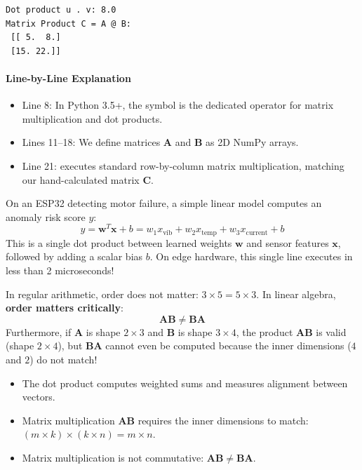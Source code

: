 \begin{lstlisting}[style=outputstyle]
Dot product u . v: 8.0
Matrix Product C = A @ B:
 [[ 5.  8.]
 [15. 22.]]
\end{lstlisting}

\paragraph{Line-by-Line Explanation}
\begin{itemize}
    \item Line 8: In Python 3.5+, the  symbol is the dedicated operator for matrix multiplication and dot products.
    \item Lines 11--18: We define matrices $\mathbf{A}$ and $\mathbf{B}$ as 2D NumPy arrays.
    \item Line 21:  executes standard row-by-column matrix multiplication, matching our hand-calculated matrix $\mathbf{C}$.
\end{itemize}

\begin{iotbox}
On an ESP32 detecting motor failure, a simple linear model computes an anomaly risk score $y$:
\begin{equation*}
y = \mathbf{w}^T \mathbf{x} + b = w_1 x_{\text{vib}} + w_2 x_{\text{temp}} + w_3 x_{\text{current}} + b
\end{equation*}
This is a single dot product between learned weights $\mathbf{w}$ and sensor features $\mathbf{x}$, followed by adding a scalar bias $b$. On edge hardware, this single line executes in less than 2 microseconds!
\end{iotbox}

\begin{warning}
In regular arithmetic, order does not matter: $3 \times 5 = 5 \times 3$. In linear algebra, \textbf{order matters critically}:
\begin{equation*}
\mathbf{A}\mathbf{B} \ne \mathbf{B}\mathbf{A}
\end{equation*}
Furthermore, if $\mathbf{A}$ is shape $2 \times 3$ and $\mathbf{B}$ is shape $3 \times 4$, the product $\mathbf{A}\mathbf{B}$ is valid (shape $2 \times 4$), but $\mathbf{B}\mathbf{A}$ cannot even be computed because the inner dimensions ($4$ and $2$) do not match!
\end{warning}

\begin{takeaways}
\begin{itemize}
    \item The dot product computes weighted sums and measures alignment between vectors.
    \item Matrix multiplication $\mathbf{A}\mathbf{B}$ requires the inner dimensions to match: $(m \times k) \times (k \times n) = m \times n$.
    \item Matrix multiplication is not commutative: $\mathbf{A}\mathbf{B} \ne \mathbf{B}\mathbf{A}$.
\end{itemize}
\end{takeaways}

